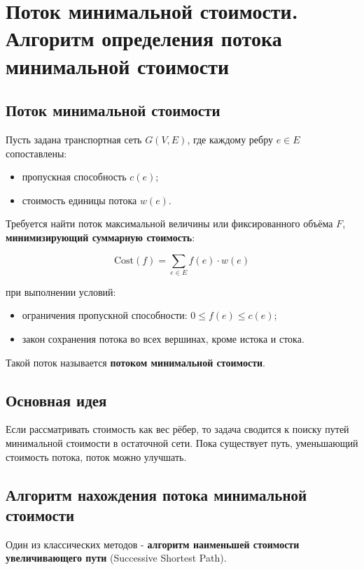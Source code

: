 {
	\section{Поток минимальной стоимости. Алгоритм определения потока минимальной
стоимости}

\subsection*{Поток минимальной стоимости}

Пусть задана транспортная сеть $G(V, E)$, где каждому ребру $e \in E$ сопоставлены:
\begin{itemize}
  \item пропускная способность $c(e)$;
  \item стоимость единицы потока $w(e)$.
\end{itemize}

Требуется найти поток максимальной величины или фиксированного объёма $F$,  
\textbf{минимизирующий суммарную стоимость}:



\[
\text{Cost}(f) = \sum_{e \in E} f(e) \cdot w(e)
\]



при выполнении условий:
\begin{itemize}
  \item ограничения пропускной способности: \quad $0 \le f(e) \le c(e)$;
  \item закон сохранения потока во всех вершинах, кроме истока и стока.
\end{itemize}

Такой поток называется \textbf{потоком минимальной стоимости}.

\subsection*{Основная идея}

Если рассматривать стоимость как вес рёбер, то задача сводится к поиску путей минимальной стоимости в остаточной сети.  
Пока существует путь, уменьшающий стоимость потока, поток можно улучшать.

\subsection*{Алгоритм нахождения потока минимальной стоимости}

Один из классических методов - \textbf{алгоритм наименьшей стоимости увеличивающего пути} (Successive Shortest Path).

}
